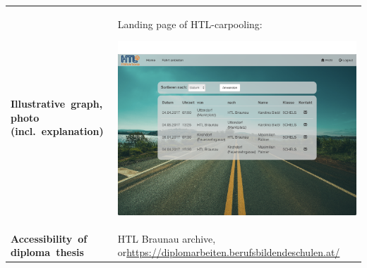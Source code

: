 \renewcommand{\arraystretch}{2}
\begin{tabularx}{1\textwidth}{ p{3.5cm} X }

\textbf{\mbox{Illustrative graph,} \mbox{photo} \mbox{(incl. explanation)}} & 
{
Landing page of HTL-carpooling:
\begin{center}
	\includegraphics[width=1\linewidth]{media/images/typ_screen}
\end{center}
} \\
  

\textbf{\mbox{Accessibility of} \mbox{diploma thesis}} & 
{HTL Braunau archive, or\newline \url{https://diplomarbeiten.berufsbildendeschulen.at/}} \\



\end{tabularx}








